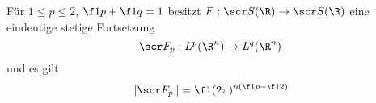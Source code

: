 \begin{nt} \label{4.31}
	Für $1 \le p \le 2$, $\f 1p + \f 1q = 1$ besitzt $F : \scr S(\R) \to \scr S(\R)$ eine eindeutige stetige Fortsetzung
	\[
		\scr F_p : L^p(\R^n) \to L^q(\R^n)
	\]
	und es gilt
	\[
		\| \scr F_p \| = \f 1{(2\pi)^{n(\f 1p-\f 12)}}
	\]
\end{nt}
